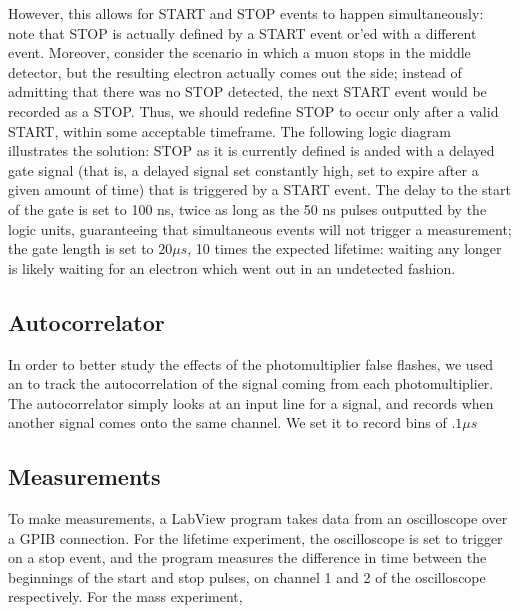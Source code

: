 However, this allows for START and STOP events to happen simultaneously: note that STOP is actually defined by a START event or'ed with a different event. Moreover, consider the scenario in which a muon stops in the middle detector, but the resulting electron actually comes out the side; instead of admitting that there was no STOP detected, the next START event would be recorded as a STOP. Thus, we should redefine STOP to occur only after a valid START, within some acceptable timeframe. The following logic diagram illustrates the solution: STOP as it is currently defined is anded with a delayed gate signal (that is, a delayed signal set constantly high, set to expire after a given amount of time) that is triggered by a START event. The delay to the start of the gate is set to 100 ns, twice as long as the 50 ns pulses outputted by the logic units, guaranteeing that simultaneous events will not trigger a measurement; the gate length is set to $20 \mu s$, 10 times the expected lifetime: waiting any longer is likely waiting for an electron which went out in an undetected fashion.

\subsection{Autocorrelator}
In order to better study the effects of the photomultiplier false flashes, we used an to track the autocorrelation of the signal coming from each photomultiplier. The autocorrelator simply looks at an input line for a signal, and records when another signal comes onto the same channel. We set it to record bins of $.1 \mu s$

\subsection{Measurements}
To make measurements, a LabView program takes data from an oscilloscope over a GPIB connection. For the lifetime experiment, the oscilloscope is set to trigger on a stop event, and the program measures the difference in time between the beginnings of the start and stop pulses, on channel 1 and 2 of the oscilloscope respectively. For the mass experiment, 
